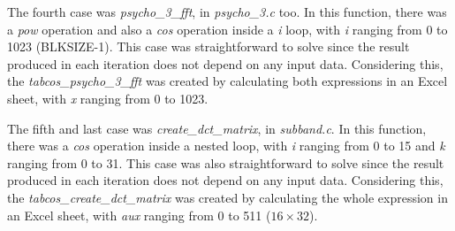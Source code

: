 \begin{comment}
\begin{figure}[H]
\centerline{\fbox{\texttt{[image: spl.pdf]}}}
\caption{\textit{psycho\_3\_spl} function.}
\label{spl}
\end{figure}

\vspace{1cm}
\end{comment}

The fourth case was \textit{psycho\_3\_fft}, in \textit{psycho\_3.c} too. In this function, there was a \textit{pow} operation and also a \textit{cos} operation inside a \textit{i} loop, with \textit{i} ranging from 0 to 1023 (BLKSIZE-1). This case was straightforward to solve since the result produced in each iteration does not depend on any input data. Considering this, the \textit{tabcos\_psycho\_3\_fft} was created by calculating both expressions in an Excel sheet, with \textit{x} ranging from 0 to 1023.

\begin{comment}
\begin{figure}[H]
\centerline{\texttt{[image: fft.pdf]}}
\caption{\textit{psycho\_3\_fft} function.}
\label{fft}
\end{figure}

\vspace{1cm}
\end{comment}

The fifth and last case was \textit{create\_dct\_matrix}, in \textit{subband.c}. In this function, there was a \textit{cos} operation inside a nested loop, with \textit{i} ranging from 0 to 15 and \textit{k} ranging from 0 to 31. This case was also straightforward to solve since the result produced in each iteration does not depend on any input data. Considering this, the \textit{tabcos\_create\_dct\_matrix} was created by calculating the whole expression in an Excel sheet, with \textit{aux} ranging from 0 to 511 ($16 \times 32$).

\begin{comment}
\begin{figure}[H]
\centerline{\fbox{\texttt{[image: dct.pdf]}}}
\caption{\textit{create\_dct\_matrix} function.}
\label{dct}
\end{figure}

\vspace{1cm}
\end{comment}

